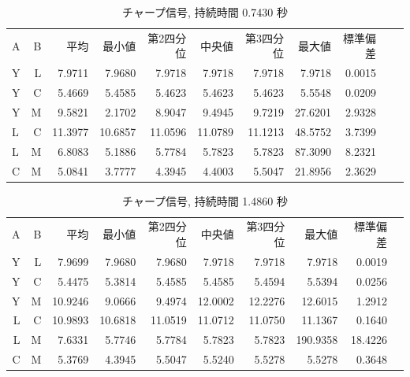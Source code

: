 \begin{table}[p]\centering
  \caption{チャープ信号, 持続時間 0.7430 秒} %
  \label{tab:hikak7}
  \begin{tabular}{l|rrrrrrrrrr}
    \hline
     A & B & 平均 & 最小値 & 第2四分位 & 中央値 & 第3四分位 & 最大値 & 標準偏差 \\
     Y & L & 7.9711 & 7.9680 & 7.9718 & 7.9718 & 7.9718 & 7.9718 & 0.0015 \\
     Y & C & 5.4669 & 5.4585 & 5.4623 & 5.4623 & 5.4623 & 5.5548 & 0.0209 \\
     Y & M & 9.5821 & 2.1702 & 8.9047 & 9.4945 & 9.7219 & 27.6201 & 2.9328 \\
     L & C & 11.3977 & 10.6857 & 11.0596 & 11.0789 & 11.1213 & 48.5752 & 3.7399 \\
     L & M & 6.8083 & 5.1886 & 5.7784 & 5.7823 & 5.7823 & 87.3090 & 8.2321 \\
     C & M & 5.0841 & 3.7777 & 4.3945 & 4.4003 & 5.5047 & 21.8956 & 2.3629 \\

    \hline
  \end{tabular}
\end{table}

\begin{table}[p]\centering
  \caption{チャープ信号, 持続時間 1.4860 秒} %
  \label{tab:hikaku8}
  \begin{tabular}{rrrrrrrrrr}
    \hline
     A & B & 平均 & 最小値 & 第2四分位 & 中央値 & 第3四分位 & 最大値 & 標準偏差 \\
     Y & L & 7.9699 & 7.9680 & 7.9680 & 7.9718 & 7.9718 & 7.9718 & 0.0019 \\
     Y & C & 5.4475 & 5.3814 & 5.4585 & 5.4585 & 5.4594 & 5.5394 & 0.0256 \\
     Y & M & 10.9246 & 9.0666 & 9.4974 & 12.0002 & 12.2276 & 12.6015 & 1.2912 \\
     L & C & 10.9893 & 10.6818 & 11.0519 & 11.0712 & 11.0750 & 11.1367 & 0.1640 \\
     L & M & 7.6331 & 5.7746 & 5.7784 & 5.7823 & 5.7823 & 190.9358 & 18.4226 \\
     C & M & 5.3769 & 4.3945 & 5.5047 & 5.5240 & 5.5278 & 5.5278 & 0.3648 \\
    \hline
  \end{tabular}
\end{table}



\clearpage




